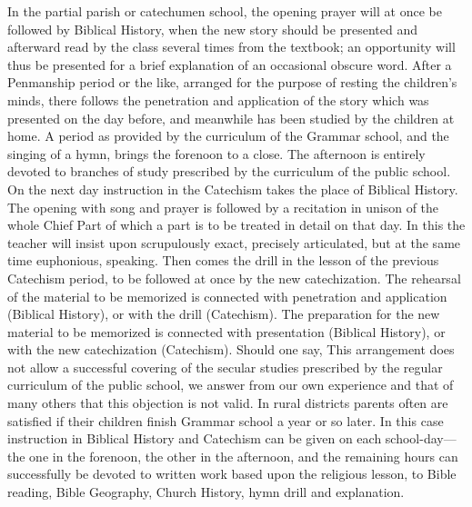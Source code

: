 In the partial parish or catechumen school, the opening prayer will at once be followed by Biblical History, when the new story should be presented and afterward read by the class several times from the textbook; an opportunity will thus be presented for a brief explanation of an occasional obscure word. After a Penmanship period or the like, arranged for the purpose of resting the children’s minds, there follows the penetration and application of the story which was presented on the day before, and meanwhile has been studied by the children at home. A period as provided by the curriculum of the Grammar school, and the singing of a hymn, brings the forenoon to a close. The afternoon is entirely devoted to branches of study prescribed by the curriculum of the public school. On the next day instruction in the Catechism takes the place of Biblical History. The opening with song and prayer is followed by a recitation in unison of the whole Chief Part of which a part is to be treated in detail on that day. In this the teacher will insist upon scrupulously exact, precisely articulated, but at the same time euphonious, speaking. Then comes the drill in the lesson of the previous Catechism period, to be followed
at once by the new catechization. The rehearsal of the material to be memorized is connected with penetration and application (Biblical History), or with the drill (Catechism). The preparation for the new material to be memorized is connected with presentation (Biblical History), or with the new catechization (Catechism). Should one say, This arrangement does not allow a successful covering of the secular studies prescribed by the regular curriculum of the public school, we answer from our own experience and that of many others that this objection is not valid. In rural districts parents often are satisfied if their children finish Grammar school a year or so later. In this case instruction in Biblical History and Catechism can be given on each school-day—the one in the forenoon, the other in the afternoon, and the remaining hours can successfully be devoted to written work based upon the religious lesson, to Bible reading, Bible Geography, Church History, hymn drill and explanation.

